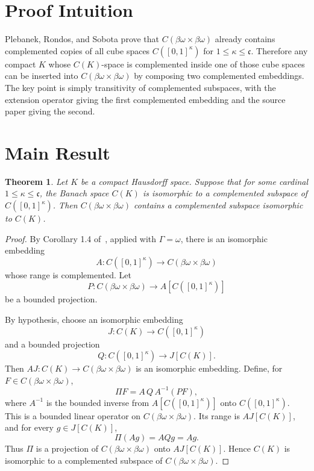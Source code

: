 \documentclass[11pt]{article}
\newtheorem{theorem}{Theorem}
\newcommand{\C}{C}
\newcommand{\bomega}{\beta\omega}
\newcommand{\cc}{\mathfrak c}
\begin{document}
\section*{Proof Intuition}

Plebanek, Rondos, and Sobota prove that \(\C(\bomega\times\bomega)\) already
contains complemented copies of all cube spaces \(\C([0,1]^\kappa)\) for
\(1\le \kappa\le\cc\).  Therefore any compact \(K\) whose \(\C(K)\)-space is
complemented inside one of those cube spaces can be inserted into
\(\C(\bomega\times\bomega)\) by composing two complemented embeddings.
The key point is simply transitivity of complemented subspaces, with the
extension operator giving the first complemented embedding and the source
paper giving the second.

\section*{Main Result}

\begin{theorem}
Let \(K\) be a compact Hausdorff space.  Suppose that for some cardinal
\(1\le \kappa\le \cc\), the Banach space \(\C(K)\) is isomorphic to a
complemented subspace of \(\C([0,1]^\kappa)\).  Then
\(\C(\bomega\times\bomega)\) contains a complemented subspace isomorphic to
\(\C(K)\).
\end{theorem}

\begin{proof}
By Corollary 1.4 of~\cite{PRS24}, applied with \(\Gamma=\omega\), there is
an isomorphic embedding
\[
A\colon \C([0,1]^\kappa)\longrightarrow \C(\bomega\times\bomega)
\]
whose range is complemented.  Let
\[
P\colon \C(\bomega\times\bomega)\longrightarrow A[\C([0,1]^\kappa)]
\]
be a bounded projection.

By hypothesis, choose an isomorphic embedding
\[
J\colon \C(K)\longrightarrow \C([0,1]^\kappa)
\]
and a bounded projection
\[
Q\colon \C([0,1]^\kappa)\longrightarrow J[\C(K)].
\]
Then \(A J\colon \C(K)\to \C(\bomega\times\bomega)\) is an isomorphic
embedding.  Define, for \(F\in \C(\bomega\times\bomega)\),
\[
\Pi F = A\, Q\, A^{-1}(P F),
\]
where \(A^{-1}\) is the bounded inverse from \(A[\C([0,1]^\kappa)]\) onto
\(\C([0,1]^\kappa)\).  This is a bounded linear operator on
\(\C(\bomega\times\bomega)\).  Its range is \(A J[\C(K)]\), and for
every \(g\in J[\C(K)]\),
\[
\Pi(A g)=A Q g=A g.
\]
Thus \(\Pi\) is a projection of \(\C(\bomega\times\bomega)\) onto
\(A J[\C(K)]\).  Hence \(\C(K)\) is isomorphic to a complemented subspace of
\(\C(\bomega\times\bomega)\).
\end{proof}
\end{document}
